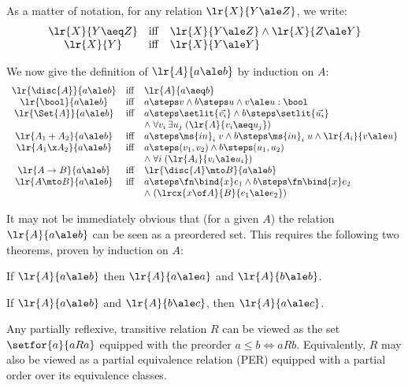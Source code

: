 As a matter of notation, for any relation $\lr{X}{Y \ale Z}$, we write:
\[\begin{array}{ccl}
  \lr{X}{Y \aeq Z} &\tiff& \lr{X}{Y \ale Z} \land \lr{X}{Z \ale Y}\\
  \lr{X}{Y}     &\tiff& \lr{X}{Y \ale Y}
\end{array}\]

We now give the definition of $\lr{A}{a \ale b}$ by induction on $A$:
\[\begin{array}{ccl}
  \lr{\disc{A}}{a \ale b} &\tiff& \lr{A}{a \aeq b}\\
  \lr{\bool}{a \ale b} &\tiff&
  a \steps v \land b \steps u \land v \ale u : \bool\\
  \lr{\Set{A}}{a \ale b} &\tiff&
  a \steps \setlit{\vec{v_i}} \land b \steps \setlit{\vec{u_i}}\\
  && \mathrel{\land} \forall v_i\,\exists u_j\; (\lr{A}{v_i \aeq u_j})\\
  \lr{A_1 + A_2}{a \ale b} &\tiff&
  a \steps \ms{in}_i\;v \land b \steps \ms{in}_i\;u \land \lr{A_i}{v \ale u}\\
  \lr{A_1 \x A_2}{a \ale b} &\tiff&
  a \steps (v_1, v_2) \land b \steps (u_1, u_2)\\
  && \mathrel{\land} \forall i\; (\lr{A_i}{v_i \ale u_i})\\
  \lr{A \to B}{a \ale b} &\tiff& \lr{\disc{A} \mto B}{a \ale b}\\
  \lr{A \mto B}{a \ale b} &\tiff&
  a \steps \fn\bind{x} e_1 \land b \steps \fn\bind{x} e_2\\
  && \mathrel{\land} (\lrcx{x\of A}{B}{e_1 \ale e_2})
\end{array}\]

It may not be immediately obvious that (for a given $A$) the relation $\lr{A}{a
  \ale b}$ can be seen as a preordered set. This requires the following two
theorems, proven by induction on $A$:

\begin{theorem}
  If $\lr{A}{a \ale b}$ then $\lr{A}{a \ale a}$ and $\lr{A}{b \ale b}$.
\end{theorem}

\begin{theorem}[Transitivity]
  If $\lr{A}{a \ale b}$ and $\lr{A}{b \ale c}$, then $\lr{A}{a \ale c}$.
\end{theorem}

Any partially reflexive, transitive relation $R$ can be viewed as the set
$\setfor{a}{aRa}$ equipped with the preorder $a \le b \iff
aRb$. Equivalently, $R$ may also be viewed as a partial
  equivalence relation (PER) equipped with a partial order over its equivalence
  classes.

